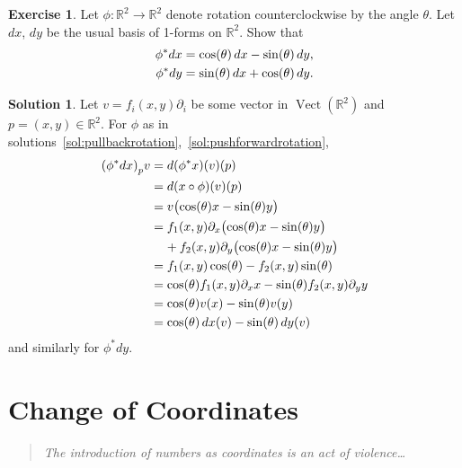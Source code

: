 \documentclass[11pt, a4paper]{report}
\theoremstyle{definition}
\newtheorem{exercise}{Exercise}[part]
\newtheorem{solution}{Solution}[part]
\newenvironment{ex}{\begin{exercise}}{\end{exercise}\pagebreak[1]}
\newenvironment{sol}{\begin{solution}}{\end{solution}\pagebreak[3]}
\newenvironment{epigraph}
    {\begin{quote}\small\itshape} %
    {\end{quote}\ignorespacesafterend\vspace{\parskip}}
\newcommand*{\pheq}{\ensuremath\mathrel{\phantom{=}}\negmedspace{}}
\newcommand*{\op}[1]{\ensuremath\mathop{}\mathopen{}#1}
\renewcommand*{\d}{\op{d}}
\DeclareMathOperator{\Vect}{Vect}
\begin{document}
\begin{ex}

Let $\phi: \mathbb{R}^2 \to \mathbb{R}^2$ denote rotation counterclockwise by the angle $\theta$. Let $dx$, $dy$ be the usual basis of 1-forms on $\mathbb{R}^2$. Show that
\begin{align*}
    \phi^* dx &= \cos(\theta) \d x - \sin(\theta) \d y, \\
    \phi^* dy &= \sin(\theta) \d x + \cos(\theta) \d y.
\end{align*}

\end{ex}

\begin{sol}

Let $v = f_i(x, y) \partial_i$ be some vector in $\Vect(\mathbb{R}^2)$ and $p = (x, y) \in \mathbb{R}^2$. For $\phi$ as in solutions~\ref{sol:pullbackrotation},~\ref{sol:pushforwardrotation},
\begin{align*}
    {(\phi^* dx)}_p v &= d(\phi^* x)(v)(p) \\
        &= d(x \circ \phi)(v)(p) \\
        &= v \bigl( \cos(\theta) x - \sin(\theta) y \bigr) \\
        &= f_1(x, y) \partial_x \bigl( \cos(\theta) x - \sin(\theta) y \bigr) \\
        &\pheq + f_2(x, y) \partial_y \bigl( \cos(\theta) x
               - \sin(\theta) y \bigr) \\
        &= f_1(x, y) \cos(\theta) - f_2(x, y) \sin(\theta) \\
        &= \cos(\theta) f_1(x, y) \partial_x x
           - \sin(\theta) f_2(x, y) \partial_y y \\
        &= \cos(\theta) v(x) - \sin(\theta) v(y) \\
        &= \cos(\theta) \d x(v) - \sin(\theta) \d y(v)
\end{align*}
and similarly for $\phi^* dy$.

\end{sol}

\section{Change of Coordinates}

\begin{epigraph}
    The introduction of numbers as coordinates \textup{\textelp{}} is an act of violence\ldots
\end{epigraph}
\end{document}
